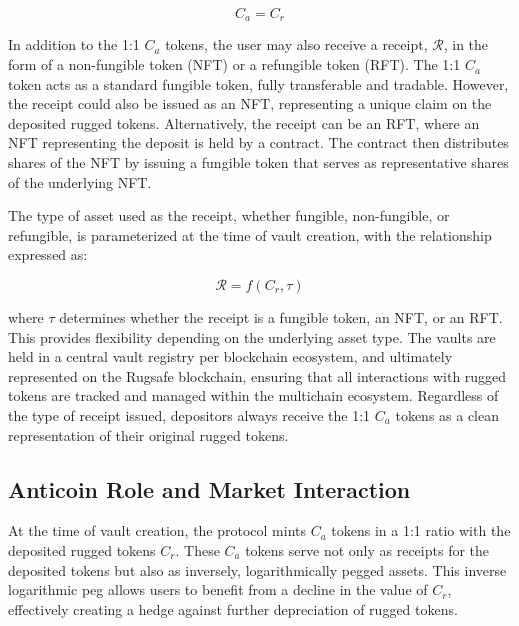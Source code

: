 \documentclass{article}
\begin{document}
\begin{equation}
C_a = C_r
\end{equation}

In addition to the 1:1 $C_a$ tokens, the user may also receive a receipt, \(\mathcal{R} \), in the form of a non-fungible token (NFT) or a refungible token (RFT). The 1:1 $C_a$ token acts as a standard fungible token, fully transferable and tradable. However, the receipt could also be issued as an NFT, representing a unique claim on the deposited rugged tokens. Alternatively, the receipt can be an RFT, where an NFT representing the deposit is held by a contract. The contract then distributes shares of the NFT by issuing a fungible token that serves as representative shares of the underlying NFT.

The type of asset used as the receipt, whether fungible, non-fungible, or refungible, is parameterized at the time of vault creation, with the relationship expressed as:

\[
\mathcal{R} = f(C_r, \tau)
\]

where $\tau$ determines whether the receipt is a fungible token, an NFT, or an RFT. This provides flexibility depending on the underlying asset type. The vaults are held in a central vault registry per blockchain ecosystem, and ultimately represented on the Rugsafe blockchain, ensuring that all interactions with rugged tokens are tracked and managed within the multichain ecosystem. Regardless of the type of receipt issued, depositors always receive the 1:1 $C_a$ tokens as a clean representation of their original rugged tokens.




\subsection{Anticoin Role and Market Interaction}

At the time of vault creation, the protocol mints $C_a$ tokens in a 1:1 ratio with the deposited rugged tokens $C_r$. These $C_a$ tokens serve not only as receipts for the deposited tokens but also as inversely, logarithmically pegged assets. This inverse logarithmic peg allows users to benefit from a decline in the value of $C_r$, effectively creating a hedge against further depreciation of rugged tokens.
\end{document}
